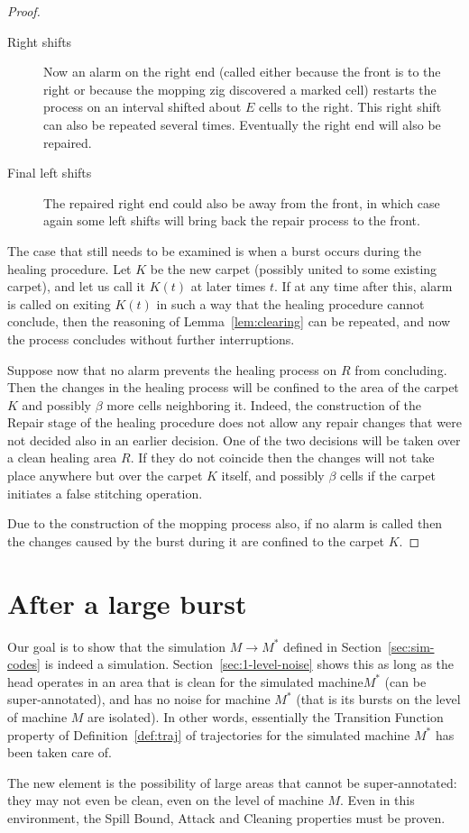 \documentclass[12pt]{memoir}
\newcommand{\E}{E}
\begin{document}
\begin{proof}
\begin{description}
\item[Right shifts] Now an alarm on the right end (called either because
the front is to the right or because the mopping zig discovered a marked cell)
restarts the process on an interval shifted about \( \E \) cells to the right.
This right shift can also be repeated several times.
Eventually the right end will also be repaired.

\item[Final left shifts]
The repaired right end could also be away from the front, in which case
again some left shifts will bring back the repair process to the front.
\end{description}

The case that still needs to be examined is when a burst occurs
during the healing procedure.
Let \( K \) be the new carpet (possibly united to some existing carpet),
and let us call it \( K(t) \) at later times \( t \).
If at any time after this, alarm is called on exiting \( K(t) \)  in such
a way that the healing procedure cannot conclude,
then the reasoning of Lemma~\ref{lem:clearing} can be repeated,
and now the process concludes without further interruptions. 

Suppose now that no alarm prevents the healing process on \( R \)
from concluding.
Then the changes in the healing process will be confined to the area of the
carpet \( K \) and possibly \( \beta \) more cells neighboring it.
Indeed, the construction of the Repair stage of the healing procedure
does not allow any repair changes that were not decided also in an earlier
decision.
One of the two decisions will be taken over a clean healing area \( R \).
If they do not coincide then the changes will not take place anywhere but
over the carpet \( K \) itself, and possibly \( \beta \) cells if the carpet
initiates a false stitching operation.

Due to the construction of the mopping process also,
if no alarm is called then the changes caused by the burst
during it are confined to the carpet \( K \).
\end{proof}


\section{After a large burst}

Our goal is to show that the simulation \( M\to M^{*} \)
defined in Section~\ref{sec:sim-codes} is indeed a simulation.
Section~\ref{sec:1-level-noise} shows this as long as the head operates in an
area that is clean for the simulated machine\( M^{*} \) (can be super-annotated), 
and has no noise for machine \( M^{*} \) (that is its bursts on the level of machine \( M \)
are isolated).
In other words, essentially the Transition Function property of Definition~\ref{def:traj} of
trajectories for the simulated machine \( M^{*} \) has been taken care of.

The new element is the possibility of large areas that cannot be super-annotated: they
may not even be clean, even on the level of machine \( M \).
Even in this environment, the Spill Bound, Attack and Cleaning properties must be proven.










\end{document}

